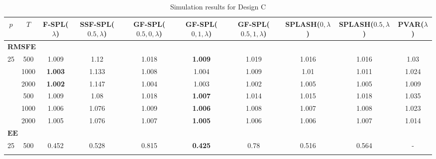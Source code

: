 \begin{landscape}
    \bgroup
    \def\arraystretch{1.3}
    \begin{table}[p]
    \small
    \centering
    \caption{Simulation results for Design C}
    \label{tab:results_designC}
    \begin{tabular}{cccccccccc}    
    \hline \hline
    $p$  &  $T$   &  F-SPL($\lambda$)  & SSF-SPL($0.5, \lambda$)  &  GF-SPL($0.5, 0, \lambda$)  &  GF-SPL($0, 1, \lambda$)  &  GF-SPL($0.5, 1, \lambda$)  &  SPLASH($0, \lambda$)  &  SPLASH($0.5, \lambda$)  &  PVAR($\lambda$)  \\
    \hline
    \multicolumn{10}{l}{\textbf{RMSFE}} \\
	\hline
	 25  & 500  & 1.009              &           1.12            &            1.018            & \textbf{1.009}            &            1.019            &         1.016          &          1.016           &       1.03        \\ \hdashline
	 25  & 1000 & \textbf{1.003}     &           1.133           &            1.008            & 1.004                     &            1.009            &          1.01          &          1.011           &       1.024       \\ \hdashline
	 25  & 2000 & \textbf{1.002}     &           1.147           &            1.004            & 1.003                     &            1.002            &         1.005          &          1.005           &       1.009       \\ \hdashline
	 36  & 500  & 1.009              &           1.08            &            1.018            & \textbf{1.007}            &            1.014            &         1.015          &          1.018           &       1.035       \\ \hdashline
	 36  & 1000 & 1.006              &           1.076           &            1.009            & \textbf{1.006}            &            1.008            &         1.007          &          1.008           &       1.023       \\ \hdashline
	 36  & 2000 & 1.005              &           1.076           &            1.007            & \textbf{1.005}            &            1.006            &         1.006          &          1.007           &       1.014       \\
	\hline
	\multicolumn{10}{l}{$\mathbf{EE}$} \\
	\hline
	 25  & 500  &       0.452        &           0.528           &            0.815            & \textbf{0.425}            &            0.78             & 0.516                  &          0.564           & -                 \\ \hdashline

\end{tabular}
\end{table}
\end{landscape}
